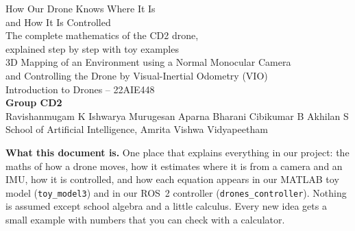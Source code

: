 \documentclass[11pt,a4paper]{article}
\newcommand{\code}[1]{\texttt{\small #1}}
\begin{document}
\begin{titlepage}
  \centering
  \vspace*{1.2cm}
  {\Huge\sffamily\color{cHead} How Our Drone Knows Where It Is\\[4pt] and How It Is Controlled\\[14pt]}
  {\Large\sffamily\color{cText} The complete mathematics of the CD2 drone,\\ explained step by step with toy examples\\[24pt]}
  {\large\sffamily 3D Mapping of an Environment using a Normal Monocular Camera\\
   and Controlling the Drone by Visual-Inertial Odometry (VIO)\\[6pt]
   Introduction to Drones -- 22AIE448\\[26pt]}
  {\large\sffamily\bfseries Group CD2}\\[6pt]
  {\sffamily Ravishanmugam K \;\textbullet\; Ishwarya Murugesan \;\textbullet\; Aparna Bharani \;\textbullet\; Cibikumar B \;\textbullet\; Akhilan S}\\[4pt]
  {\sffamily School of Artificial Intelligence, Amrita Vishwa Vidyapeetham}
  \vfill
  \begin{minipage}{0.88\linewidth}\small\color{cText}
  \textbf{What this document is.} One place that explains everything in our project: the maths
  of how a drone moves, how it estimates where it is from a camera and an IMU, how it is controlled, and how
  each equation appears in our MATLAB toy model (\code{toy\_model3}) and in our ROS~2 controller
  (\code{drones\_controller}). Nothing is assumed except school algebra and a little calculus. Every new idea
  gets a small example with numbers that you can check with a calculator.
  \end{minipage}
\end{titlepage}

\tableofcontents
\newpage









\appendix

\end{document}

